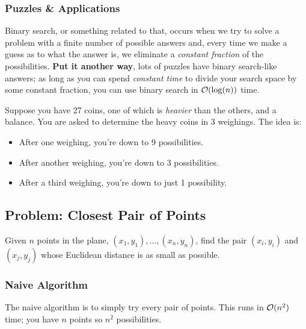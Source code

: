 \documentclass[letterpaper]{article}
\begin{document}
\subsubsection{Puzzles \& Applications}
\begin{mdframed}[]
    Binary search, or something related to that, occurs when we try to solve a problem with a finite number of possible answers and, every time we make a guess as to what the answer is, we eliminate a \emph{constant fraction} of the possibilities. \textbf{Put it another way}, lots of puzzles have binary search-like answers; as long as you can spend \emph{constant time} to divide your search space by some constant fraction, you can use binary search in $\mathcal{O}(\log(n))$ time.  
\end{mdframed}
Suppose you have 27 coins, one of which is \emph{heavier} than the others, and a balance. You are asked to determine the heavy coins in 3 weighings. The idea is: 
\begin{itemize}
    \item After one weighing, you're down to 9 possibilities. 
    \item After another weighing, you're down to 3 possibilities.
    \item After a third weighing, you're down to just 1 possibility. 
\end{itemize}


\subsection{Problem: Closest Pair of Points}
Given $n$ points in the plane, $(x_1, y_1), \dots, (x_n, y_n)$, find the pair $(x_i, y_i)$ and $(x_j, y_j)$ whose Euclidean distance is as small as possible. 

\subsubsection{Naive Algorithm}
The naive algorithm is to simply try every pair of points. This runs in $\mathcal{O}(n^2)$ time; you have $n$ points so $n^2$ possibilities. 
\end{document}
